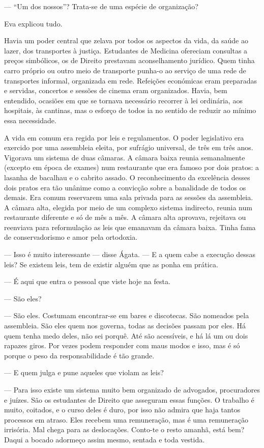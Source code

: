 --- ``Um dos nossos''? Trata-se de uma espécie de organização?

Eva explicou tudo.

Havia um poder central que zelava por todos os aspectos da vida, da
saúde ao lazer, dos transportes à justiça. Estudantes de Medicina
ofereciam consultas a preços simbólicos, os de Direito prestavam
aconselhamento jurídico. Quem tinha carro próprio ou outro meio de
transporte punha-o ao serviço de uma rede de transportes informal,
organizada em rede. Refeições económicas eram preparadas e servidas,
concertos e sessões de cinema eram organizados. Havia, bem entendido,
ocasiões em que se tornava necessário recorrer à lei ordinária, aos
hospitais, às cantinas, mas o esforço de todos ia no sentido de reduzir
ao mínimo essa necessidade.

A vida em comum era regida por leis e regulamentos. O poder legislativo
era exercido por uma assembleia eleita, por sufrágio universal, de três
em três anos. Vigorava um sistema de duas câmaras. A câmara baixa reunia
semanalmente (excepto em época de exames) num restaurante que era
famoso por dois pratos: a lasanha de bacalhau e o cabrito assado. O
reconhecimento da excelência desses dois pratos era tão unânime como a
convicção sobre a banalidade de todos os demais. Era comum reservarem
uma sala privada para as sessões da assembleia. A câmara alta, elegida
por meio de um complexo sistema indirecto, reunia num restaurante
diferente e só de mês a mês. A câmara alta aprovava, rejeitava ou
reenviava para reformulação as leis que emanavam da câmara baixa. Tinha fama
de conservadorismo e amor pela ortodoxia.

--- Isso é muito interessante --- disse Ágata. --- E a quem cabe a
  execução dessas leis? Se existem leis, tem de existir alguém que as
  ponha em prática.

--- É aqui que entra o pessoal que viste hoje na festa.

--- São eles?

--- São eles. Costumam encontrar-se em bares e discotecas. São nomeados
  pela assembleia. São eles quem nos governa, todas as decisões passam
  por eles. Há quem tenha medo deles, não sei porquê. Até são
  acessíveis, e há lá um ou dois rapazes giros. Por vezes podem
  responder com maus modos e isso, mas é só porque o peso da
  responsabilidade é tão grande.

--- E quem julga e pune aqueles que violam as leis?

--- Para isso existe um sistema muito bem organizado de advogados,
  procuradores e juízes. São os estudantes de Direito que asseguram
  essas funções. O trabalho é muito, coitados, e o curso deles é duro,
  por isso não admira que haja tantos processos em atraso. Eles
  recebem uma remuneração, mas é uma remuneração irrisória. Mal chega
  para as deslocações. Conto-te o resto amanhã, está bem? Daqui a bocado
  adormeço assim mesmo, sentada e toda vestida.

